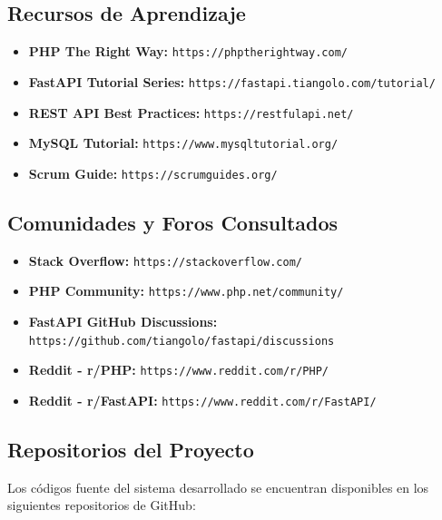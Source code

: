 \documentclass[conference]{IEEEtran}
\begin{document}
\subsection{Recursos de Aprendizaje}
\begin{itemize}
    \item \textbf{PHP The Right Way:} \texttt{https://phptherightway.com/}
    \item \textbf{FastAPI Tutorial Series:} \texttt{https://fastapi.tiangolo.com/tutorial/}
    \item \textbf{REST API Best Practices:} \texttt{https://restfulapi.net/}
    \item \textbf{MySQL Tutorial:} \texttt{https://www.mysqltutorial.org/}
    \item \textbf{Scrum Guide:} \texttt{https://scrumguides.org/}
\end{itemize}

\subsection{Comunidades y Foros Consultados}
\begin{itemize}
    \item \textbf{Stack Overflow:} \texttt{https://stackoverflow.com/}
    \item \textbf{PHP Community:} \texttt{https://www.php.net/community/}
    \item \textbf{FastAPI GitHub Discussions:} \texttt{https://github.com/tiangolo/fastapi/discussions}
    \item \textbf{Reddit - r/PHP:} \texttt{https://www.reddit.com/r/PHP/}
    \item \textbf{Reddit - r/FastAPI:} \texttt{https://www.reddit.com/r/FastAPI/}
\end{itemize}

\subsection{Repositorios del Proyecto}
Los códigos fuente del sistema desarrollado se encuentran disponibles en los siguientes repositorios de GitHub:
\end{document}
